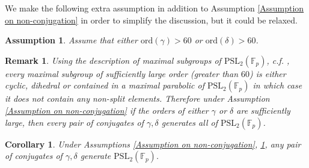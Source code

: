 \documentclass[letterpaper]{amsart}
\newtheorem{corollary}[theorem]{Corollary}
\newtheorem{remark}[theorem]{Remark}
\newtheorem{assumption}[theorem]{Assumption}
\begin{document}
We make the following extra assumption in addition to Assumption \ref{Assumption on non-conjugation} in order to simplify the discussion, but it could be relaxed.
\begin{assumption}
\label{Assumption on large orders}
    Assume that either $\mathrm{ord}(\gamma)> 60$ or $\mathrm{ord}(\delta) > 60$.
\end{assumption}
\begin{remark}
    Using the description of maximal subgroups of $\mathrm{PSL}_2(\mathbb{F}_p)$, c.f. \cite{hall1936eulerian}, every maximal subgroup of sufficiently large order (greater than $60$) is either cyclic, dihedral or contained in a maximal parabolic of $\mathrm{PSL}_2(\mathbb{F}_p)$ in which case it does not contain any non-split elements. Therefore under Assumption \ref{Assumption on non-conjugation} if the orders of either $\gamma$ or $\delta$ are sufficiently large, then every pair of conjugates of $\gamma,\delta$ generates all of $\mathrm{PSL}_2(\mathbb{F}_p)$.
\end{remark}
\begin{corollary}
\label{Conjugates Generate}
    Under Assumptions \ref{Assumption on non-conjugation}, \ref{Assumption on large orders}, any pair of conjugates of $\gamma,\delta$ generate $\mathrm{PSL}_2(\mathbb{F}_p)$.
\end{corollary}
\end{document}
